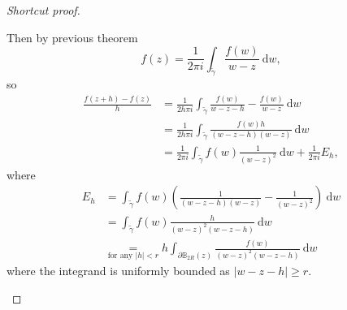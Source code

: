 \documentclass[a4paper]{article}
\theoremstyle{definition}
\begin{document}
\begin{proof}[Shortcut proof]
\begin{center}
\end{center}
Then by previous theorem
\[
f(z) =\frac{1}{2\pi i} \int_{\widetilde{\gamma}} \frac{f(w)}{w-z} \ \mathrm d w ,
\]
so
\[
\begin{aligned}
\frac{f(z+h)-f(z)}{h} &= \frac{1}{2h\pi i} \int_{\widetilde{\gamma}} \frac{f(w)}{w-z-h}-\frac{f(w)}{w-z} \ \mathrm d w \\&=\frac{1}{2h\pi i} \int_{\widetilde{\gamma}} \frac{f(w)h}{(w-z-h)(w-z)} \ \mathrm d w \\&=\frac{1}{2\pi i} \int_{\widetilde{\gamma}} f(w) \frac{1}{(w-z)^2} \ \mathrm d w + \frac{1}{2\pi i} E_h,
\end{aligned}
\]
where
\[
\begin{aligned}
E_h &= \int_{\widetilde{\gamma}} f(w) \left(\frac{1}{(w-z-h)(w-z)} - \frac{1}{(w-z)^2} \right) \ \mathrm d w \\&=\int_{\widetilde{\gamma}} f(w) \frac{h}{(w-z)^2(w-z-h)} \ \mathrm d w \\&\underset{\text{for any }|h|<r}{=} h \int_{\partial \mathbb B_{2R}(z)} \frac{f(w)}{(w-z)^2 (w-z-h)} \ \mathrm d w
\end{aligned}
\]
where the integrand is uniformly bounded as $|w-z-h|\geq r$.
\begin{center}
\end{center}


\end{proof}
\end{document}

